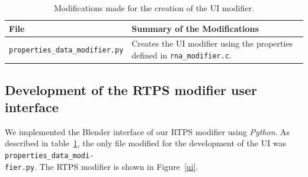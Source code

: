 \vspace{16pt}
\begin{table}[htdp]
\caption{Modifications made for the creation of the UI modifier.}
\begin{center}
\begin{tabular}{|p{6cm}|p{6cm}|}
\hline 
\textbf{File} & \textbf{Summary of the Modifications} \\\hline 
\texttt{properties\_data\_modifier.py} & Creates the UI modifier using the properties defined in \texttt{rna\_modifier.c}. \\
\hline 
\end{tabular}
\end{center}
\label{uiTable}
\end{table}

\subsection{Development of the RTPS modifier user interface}
We implemented the Blender interface of our RTPS modifier using \textit{Python}. As described in table~\ref{uiTable}, the only file modified for the development of the UI was \texttt{properties\_data\_modi-\\fier.py}. The RTPS modifier is shown in Figure~\ref{ui}.

